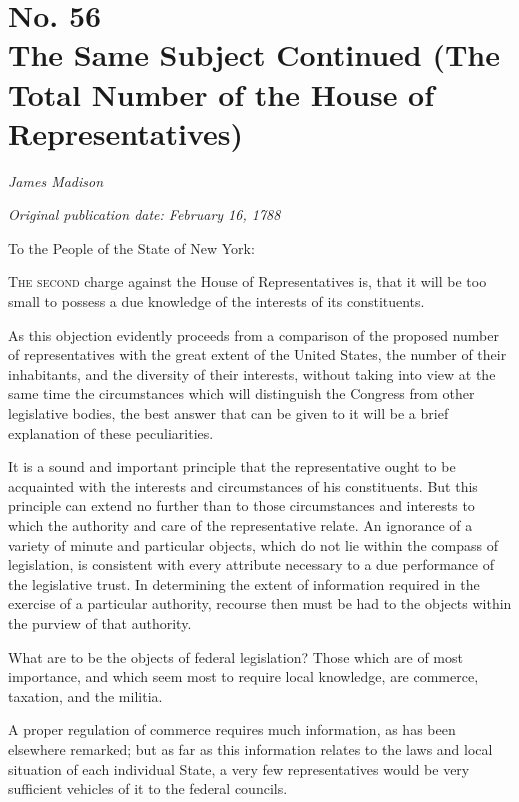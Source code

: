 \chapter[No. 56: The Same Subject Continued (The Total Number of the House of Representatives)]{No. 56\\ {\small The Same Subject Continued (The Total Number of the House of Representatives)}}

\textit{James Madison}

\textit{Original publication date: February 16, 1788}
\vspace{1cm}

To the People of the State of New York:
\vspace{.4cm}

\textsc{The second} charge against the House of Representatives is, that it will be too small to possess a due knowledge of the interests of its constituents.

As this objection evidently proceeds from a comparison of the proposed number of representatives with the great extent of the United States, the number of their inhabitants, and the diversity of their interests, without taking into view at the same time the circumstances which will distinguish the Congress from other legislative bodies, the best answer that can be given to it will be a brief explanation of these peculiarities.

It is a sound and important principle that the representative ought to be acquainted with the interests and circumstances of his constituents. 
But this principle can extend no further than to those circumstances and interests to which the authority and care of the representative relate. 
An ignorance of a variety of minute and particular objects, which do not lie within the compass of legislation, is consistent with every attribute necessary to a due performance of the legislative trust. 
In determining the extent of information required in the exercise of a particular authority, recourse then must be had to the objects within the purview of that authority.

What are to be the objects of federal legislation? 
Those which are of most importance, and which seem most to require local knowledge, are commerce, taxation, and the militia.

A proper regulation of commerce requires much information, as has been elsewhere remarked; but as far as this information relates to the laws and local situation of each individual State, a very few representatives would be very sufficient vehicles of it to the federal councils.

